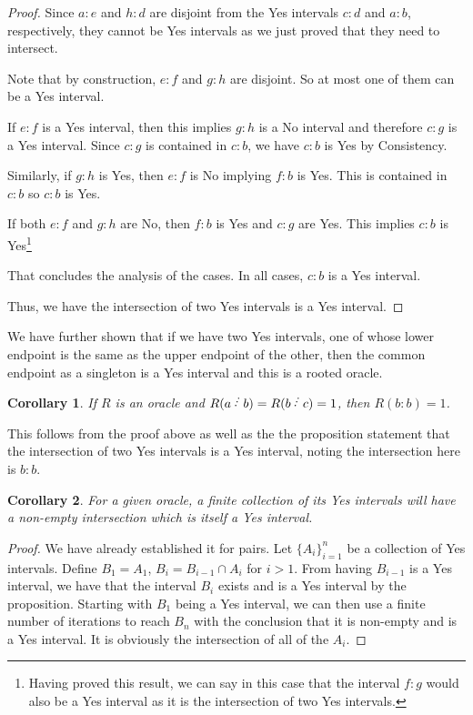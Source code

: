 \documentclass[12pt]{article}
\newtheorem{corollary}{Corollary}[subsection]
\begin{document}
\begin{proof}
Since $a:e$ and $h:d$ are disjoint from the Yes intervals $c:d$ and $a:b$, respectively, they cannot be Yes intervals as we just proved that they need to intersect. 

Note that by construction, $e:f$ and $g:h$ are disjoint. So at most one of them can be a Yes interval. 

If $e:f$ is a Yes interval, then this implies $g:h$ is a No interval and therefore $c:g$ is a Yes interval. Since $c:g$ is contained in $c:b$, we have $c:b$ is Yes by Consistency. 

Similarly, if $g:h$ is Yes, then $e:f$ is No implying $f:b$ is Yes. This is contained in $c:b$ so $c:b$ is Yes. 

If both $e:f$ and $g:h$ are No, then $f:b$ is Yes and $c:g$ are Yes. This implies $c:b$ is Yes\footnote{Having proved this result, we can say in this case that the interval $f:g$ would also be a Yes interval as it is the intersection of two Yes intervals.} 

That concludes the analysis of the cases. In all cases, $c:b$ is a Yes interval. 

Thus, we have the intersection of two Yes intervals is a Yes interval. 

\end{proof}

We have further shown that if we have two Yes intervals, one of whose lower endpoint is the same as the upper endpoint of the other, then the common endpoint as a singleton is a Yes interval and this is a rooted oracle. 

\begin{corollary}\label{cor:kissing}
    If $R$ is an oracle and $R(a\lte b)=R(b \lte c) = 1$, then $R(b:b)=1$. 
\end{corollary}

This follows from the proof above as well as the the proposition statement that the intersection of two Yes intervals is a Yes interval, noting the intersection here is $b:b$. 

\begin{corollary}\label{cor:finite-inter}
    For a given oracle, a finite collection of its Yes intervals will have a non-empty intersection which is itself a Yes interval. 
\end{corollary}

\begin{proof}
We have already established it for pairs. Let  $\{A_i\}_{i=1}^n$ be a collection of Yes intervals. Define $B_1 = A_1$, $B_i = B_{i-1} \cap A_i$ for $i > 1$. From having $B_{i-1}$ is a Yes interval, we have that the interval $B_i$ exists and is a Yes interval by the proposition. Starting with $B_1$ being a Yes interval, we can then use a finite number of iterations to reach $B_n$ with the conclusion that it is non-empty and is a Yes interval. It is obviously the intersection of all of the $A_i$.
\end{proof}
\end{document}
